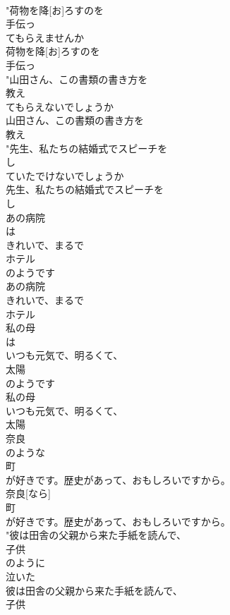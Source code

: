 \documentclass[8pt]{extreport}
\begin{document}
\begin{CJK}{UTF8}{min}
\\	"荷物を降[お]ろすのを
\\	手伝っ
\\	てもらえませんか
\\	荷物を降[お]ろすのを
\\	手伝っ
\\	"山田さん、この書類の書き方を
\\	教え
\\	てもらえないでしょうか
\\	山田さん、この書類の書き方を
\\	教え
\\	"先生、私たちの結婚式でスピーチを
\\	し
\\	ていたでけないでしょうか
\\	先生、私たちの結婚式でスピーチを
\\	し
\\	あの病院
\\	は
\\	きれいで、まるで
\\	ホテル
\\	のようです
\\	あの病院
\\	きれいで、まるで
\\	ホテル
\\	私の母
\\	は
\\	いつも元気で、明るくて、
\\	太陽
\\	のようです
\\	私の母
\\	いつも元気で、明るくて、
\\	太陽
\\	奈良
\\	のような
\\	町
\\	が好きです。歴史があって、おもしろいですから。
\\	奈良[なら]
\\	町
\\	が好きです。歴史があって、おもしろいですから。
\\	"彼は田舎の父親から来た手紙を読んで、
\\	子供
\\	のように
\\	泣いた
\\	彼は田舎の父親から来た手紙を読んで、
\\	子供

\end{CJK}
\end{document}
